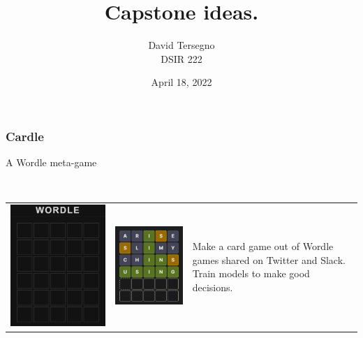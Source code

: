 \documentclass[aspectratio=169,12pt]{beamer}
\title{\normalsize Capstone ideas.}
\author{David Tersegno\\\scriptsize DSIR 222}
\date{April 18, 2022}
\begin{document}
	
	\begin{frame}
		\maketitle
	\end{frame}


	\begin{frame}
		\frametitle{Cardle}
		A Wordle meta-game\\
		\vfill\vfill\strut\\
		\begin{tabular}{ccp{120pt}}
			\includegraphics[width=0.3\linewidth, trim = 0 80pt 0 80pt]{pix/wordleSS}	&	
			\includegraphics[width=0.3\linewidth, trim =0 60pt 0 60pt]{pix/wordplay}&
			Make a card game out of Wordle games shared on Twitter and Slack. Train models to make good decisions.
		\end{tabular}
	\end{frame}
\end{document}
